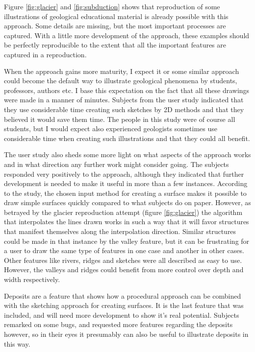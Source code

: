 \documentclass[a4paper,12pt]{report}
\begin{document}
Figure \ref{fig:glacier} and \ref{fig:subduction} shows that reproduction of some illustrations of geological educational material is already possible with this approach. Some details are missing, but the most important processes are captured. With a little more development of the approach, these examples should be perfectly reproducible to the extent that all the important features are captured in a reproduction.

When the approach gains more maturity, I expect it or some similar approach could become the default way to illustrate geological phenomena by students, professors, authors etc. I base this expectation on the fact that all these drawings were made in a manner of minutes. Subjects from the user study indicated that they use considerable time creating such sketches by 2D methods and that they believed it would save them time. The people in this study were of course all students, but I would expect also experienced geologists sometimes use considerable time when creating such illustrations and that they  could all benefit.

The user study also sheds some more light on what aspects of the approach works and in what direction any further work might consider going. The subjects responded very positively to the approach, although they indicated that further development is needed to make it useful in more than a few instances. According to the study, the chosen input method for creating a surface makes it possible to draw simple surfaces quickly compared to what subjects do on paper. However, as betrayed by the glacier reproduction attempt (figure \ref{fig:glacier}) the algorithm that interpolates the lines drawn works in such a way that it will favor structures that manifest themselves along the interpolation direction. Similar structures could be made in that instance by the valley feature, but it can be frustrating for a user to draw the same type of features in one case and another in other cases. Other features like rivers, ridges and sketches were all described as easy to use. However, the valleys and ridges could benefit from 
more control over depth and width respectively. 

Deposits are a feature that shows how a procedural approach can be combined with the sketching approach for creating surfaces. It is the last feature that was included, and will need more development to show it's real potential. Subjects remarked on some bugs, and requested more features regarding the deposits however, so in their eyes it presumably can also be useful to illustrate deposits in this way. 
\end{document}
